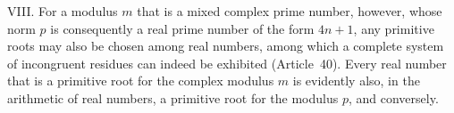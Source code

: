 VIII. For a modulus $m$ that is a mixed complex prime number, however, whose norm $p$ is consequently a real prime number of the form $4n+1$, any primitive roots may also be chosen among real numbers, among which a complete system of incongruent residues can indeed be exhibited (Article~40). Every real number that is a primitive root for the complex modulus $m$ is evidently also, in the arithmetic of real numbers, a primitive root for the modulus $p$, and conversely.

